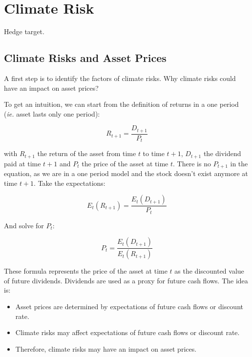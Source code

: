\chapter{Climate Risk}


Hedge target.


\section{Climate Risks and Asset Prices}

A first step is to identify the factors of climate risks.
Why climate risks could have an impact on asset prices?

To get an intuition, we can start from the definition of 
returns in a one period  (\textit{ie.} asset lasts only one period):

\begin{equation}
    R_{t+1} = \frac{D_{t+1}}{P_t}
\end{equation}

with $R_{t+1}$ the return of the asset from time $t$ to time $t+1$, 
$D_{t+1}$ the dividend paid at time $t+1$ 
and $P_t$ the price of the asset at time $t$.
There is no $P_{t+1}$ in the equation, 
as we are in a one period model and 
the stock doesn't exist anymore at time $t+1$. Take the expectations:

\begin{equation}
    E_t(R_{t+1}) = \frac{E_t(D_{t+1})}{P_t}
\end{equation}

And solve for $P_t$:

\begin{equation}
    P_t = \frac{E_t(D_{t+1})}{E_t(R_{t+1})}
\end{equation}

These formula 
represents the price of the asset at time $t$ 
as the discounted value of future dividends.
Dividends are used as a proxy for future cash flows.
The idea is: 

\begin{itemize}
    \item Asset prices are determined by
    expectations of future cash flows or discount rate.
    \item Climate risks may 
    affect expectations of future cash flows or discount rate.
    \item Therefore, climate risks may have an impact on asset prices.
\end{itemize}



